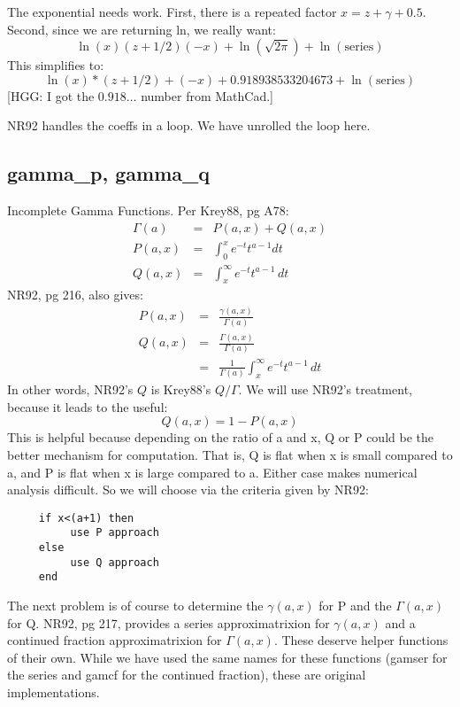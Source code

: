 The exponential needs work.  First, there
is a repeated factor $x=z+\gamma+0.5$.  Second, since we are
returning ln, we really want:
\begin{equation}
  \ln(x)(z+1/2)(-x)+\ln(\sqrt{2\pi})+\ln(\mbox{series})
\end{equation}
This simplifies to:
\begin{equation}
  \ln(x)*(z+1/2)+(-x)+0.918938533204673+\ln(\mbox{series})
\end{equation}
[HGG: I got the $0.918\ldots $ number from MathCad.]

NR92 handles the coeffs in a loop.  We have unrolled the loop here.

\subsection*{gamma\_p, gamma\_q}
Incomplete Gamma Functions.  Per Krey88, pg A78:
\begin{eqnarray}
 \Gamma(a) & =& P(a,x) + Q(a,x)\\
 P(a,x) & = & \int_0^x e^{-t}t^{a-1}dt\\
 Q(a,x) & = & \int_x^\infty e^{-t}t^{a-1}\,dt
\end{eqnarray}
NR92, pg 216, also gives:
\begin{eqnarray}
  P(a,x) & = & \frac{\gamma (a,x)}{\Gamma (a)}\\
  Q(a,x) & = & \frac{\Gamma (a,x)}{\Gamma (a)}\\
         & = & \frac{1}{\Gamma(a)} \int_x^\infty e^{-t}t^{a-1}\,dt
\end{eqnarray}
In other words, NR92's $Q$ is Krey88's $Q/\Gamma$.  We will use 
NR92's treatment, because it leads to the useful:
\begin{equation}
  Q(a,x) = 1 - P(a,x)
\end{equation}
This is helpful because depending on the ratio of a and x, Q or P could
be the better mechanism for computation.  That is, Q is flat when 
x is small compared to a, and P is flat when x is large compared to a.
Either case makes numerical analysis difficult.  So we will choose
via the criteria given by NR92:
\begin{verbatim}
     if x<(a+1) then
          use P approach
     else
          use Q approach
     end
\end{verbatim}

The next problem is of course to determine the $\gamma(a,x)$ for P and
the $\Gamma(a,x)$ for Q.  NR92, pg 217, provides a series approximatrixion
for $\gamma(a,x)$ and a continued fraction approximatrixion
for $\Gamma(a,x)$. These deserve helper functions of their own.
While we have used the same
names for these functions (gamser for the series and gamcf for the
continued fraction), these are original implementations.


